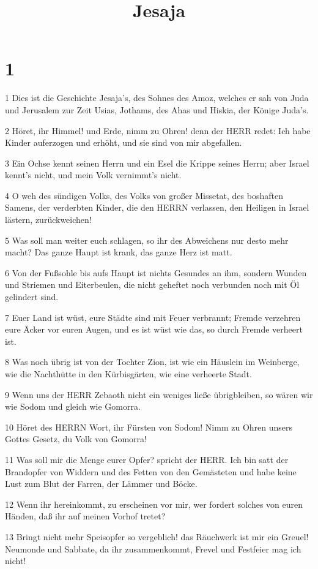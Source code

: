 

\title{Jesaja}


\chapter{1}

\par 1 Dies ist die Geschichte Jesaja's, des Sohnes des Amoz, welches er sah von Juda und Jerusalem zur Zeit Usias, Jothams, des Ahas und Hiskia, der Könige Juda's.
\par 2 Höret, ihr Himmel! und Erde, nimm zu Ohren! denn der HERR redet: Ich habe Kinder auferzogen und erhöht, und sie sind von mir abgefallen.
\par 3 Ein Ochse kennt seinen Herrn und ein Esel die Krippe seines Herrn; aber Israel kennt's nicht, und mein Volk vernimmt's nicht.
\par 4 O weh des sündigen Volks, des Volks von großer Missetat, des boshaften Samens, der verderbten Kinder, die den HERRN verlassen, den Heiligen in Israel lästern, zurückweichen!
\par 5 Was soll man weiter euch schlagen, so ihr des Abweichens nur desto mehr macht? Das ganze Haupt ist krank, das ganze Herz ist matt.
\par 6 Von der Fußsohle bis aufs Haupt ist nichts Gesundes an ihm, sondern Wunden und Striemen und Eiterbeulen, die nicht geheftet noch verbunden noch mit Öl gelindert sind.
\par 7 Euer Land ist wüst, eure Städte sind mit Feuer verbrannt; Fremde verzehren eure Äcker vor euren Augen, und es ist wüst wie das, so durch Fremde verheert ist.
\par 8 Was noch übrig ist von der Tochter Zion, ist wie ein Häuslein im Weinberge, wie die Nachthütte in den Kürbisgärten, wie eine verheerte Stadt.
\par 9 Wenn uns der HERR Zebaoth nicht ein weniges ließe übrigbleiben, so wären wir wie Sodom und gleich wie Gomorra.
\par 10 Höret des HERRN Wort, ihr Fürsten von Sodom! Nimm zu Ohren unsers Gottes Gesetz, du Volk von Gomorra!
\par 11 Was soll mir die Menge eurer Opfer? spricht der HERR. Ich bin satt der Brandopfer von Widdern und des Fetten von den Gemästeten und habe keine Lust zum Blut der Farren, der Lämmer und Böcke.
\par 12 Wenn ihr hereinkommt, zu erscheinen vor mir, wer fordert solches von euren Händen, daß ihr auf meinen Vorhof tretet?
\par 13 Bringt nicht mehr Speisopfer so vergeblich! das Räuchwerk ist mir ein Greuel! Neumonde und Sabbate, da ihr zusammenkommt, Frevel und Festfeier mag ich nicht!
